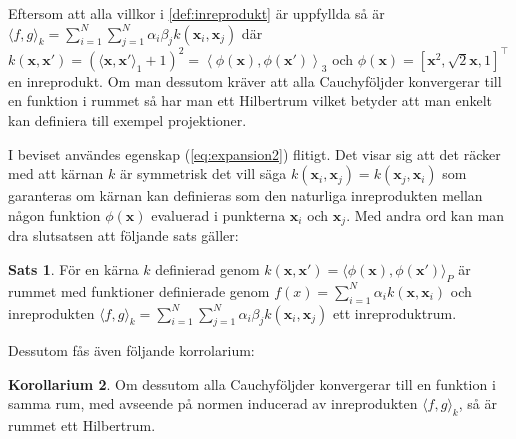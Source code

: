 \documentclass[a4paper, 12pt]{report}
\theoremstyle{definition}
\newtheorem{thm}{Sats}[section]
\newtheorem{cor}[thm]{Korollarium}
\theoremstyle{remark}
\newcommand{\bfx}{\mathbf{x}}
\begin{document}
\begin{enumerate}
\end{enumerate}
Eftersom att alla villkor i \ref{def:inreprodukt} är uppfyllda så är $\langle f, g\rangle_k = \sum_{i=1}^{N}\sum_{j=1}^{N}\alpha_i\beta_jk\left(\bfx_i,\bfx_j\right)$ där $k\left(\bfx, \bfx'\right)=\left(\langle \bfx, \bfx'\rangle_1 + 1\right)^2= \left\langle \phi\left(\bfx\right), \phi\left(\bfx'\right)\right\rangle_3$ och $\phi\left(\bfx\right)=\left[\bfx^2, \sqrt{2}\bfx, 1 \right]^\intercal$ en inreprodukt. Om man dessutom kräver att alla Cauchyföljder konvergerar till en funktion i rummet så har man ett Hilbertrum vilket betyder att man enkelt kan definiera till exempel projektioner.

I beviset användes egenskap (\ref{eq:expansion2}) flitigt. Det visar sig att det räcker med att kärnan $k$ är symmetrisk det vill säga $k\left(\bfx_i,\bfx_j\right)=k\left(\bfx_j,\bfx_i\right)$ som garanteras om kärnan kan definieras som den naturliga inreprodukten mellan någon funktion $\phi\left(\mathbf{x}\right)$ evaluerad i punkterna $\bfx_i$ och $\bfx_j$. Med andra ord kan man dra slutsatsen att följande sats gäller:
\begin{thm}\label{thm:kärnainreprodukt}
	För en kärna $k$ definierad genom $k\left(\bfx, \bfx'\right)=\langle \phi\left(\bfx\right), \phi\left(\bfx'\right)\rangle_P$ är rummet med funktioner definierade genom $f\left(x\right) = \sum_{i=1}^{N}\alpha_ik\left(\bfx, \bfx_i\right)$ och inreprodukten $\langle f,g\rangle_k = \sum_{i=1}^{N}\sum_{j=1}^{N} \alpha_i\beta_jk\left(\bfx_i,\bfx_j\right)$ ett inreproduktrum.
\end{thm}
Dessutom fås även följande korrolarium:
\begin{cor}\label{cor:kärnahilbert}
	Om dessutom alla Cauchyföljder konvergerar till en funktion i samma rum, med avseende på normen inducerad av inreprodukten $\langle f, g\rangle_k$, så är rummet ett Hilbertrum.
\end{cor}
\end{document}
